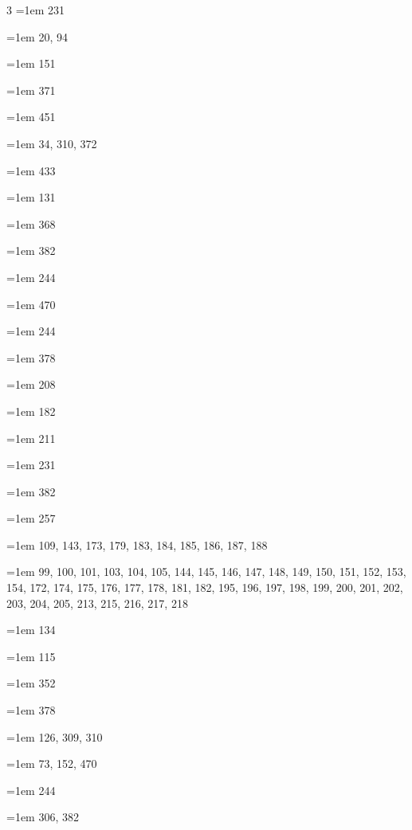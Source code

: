 \begin{multicols}{3}
\hangindent=1em  231\par
\hangindent=1em  20, 94\par
\hangindent=1em  151\par
\hangindent=1em  371\par
\hangindent=1em  451\par
\hangindent=1em  34, 310, 372\par
\hangindent=1em  433\par
\hangindent=1em  131\par
\hangindent=1em  368\par
\hangindent=1em  382\par
\hangindent=1em  244\par
\hangindent=1em  470\par
\hangindent=1em  244\par
\hangindent=1em  378\par
\hangindent=1em  208\par
\hangindent=1em  182\par
\hangindent=1em  211\par
\hangindent=1em  231\par
\hangindent=1em  382\par
\hangindent=1em  257\par
\hangindent=1em  109, 143, 173, 179, 183, 184, 185, 186, 187, 188\par
\hangindent=1em  99, 100, 101, 103, 104, 105, 144, 145, 146, 147, 148, 149, 150, 151, 152, 153, 154, 172, 174, 175, 176, 177, 178, 181, 182, 195, 196, 197, 198, 199, 200, 201, 202, 203, 204, 205, 213, 215, 216, 217, 218\par
\hangindent=1em  134\par
\hangindent=1em  115\par
\hangindent=1em  352\par
\hangindent=1em  378\par
\hangindent=1em  126, 309, 310\par
\hangindent=1em  73, 152, 470\par
\hangindent=1em  244\par
\hangindent=1em  306, 382\par

\end{multicols}
